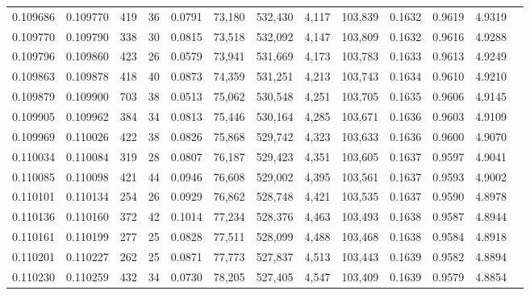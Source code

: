 \begin{tabular}{rrrrrrrrrrrrr}
0.109686 & 0.109770 &   419 &  36 &                                     0.0791 &  73,180 & 532,430 &   4,117 & 103,839 & 0.1632 & 0.9619 & 4.9319 \\
0.109770 & 0.109790 &   338 &  30 &                                     0.0815 &  73,518 & 532,092 &   4,147 & 103,809 & 0.1632 & 0.9616 & 4.9288 \\
0.109796 & 0.109860 &   423 &  26 &                                     0.0579 &  73,941 & 531,669 &   4,173 & 103,783 & 0.1633 & 0.9613 & 4.9249 \\
0.109863 & 0.109878 &   418 &  40 &                                     0.0873 &  74,359 & 531,251 &   4,213 & 103,743 & 0.1634 & 0.9610 & 4.9210 \\
0.109879 & 0.109900 &   703 &  38 &                                     0.0513 &  75,062 & 530,548 &   4,251 & 103,705 & 0.1635 & 0.9606 & 4.9145 \\
0.109905 & 0.109962 &   384 &  34 &                                     0.0813 &  75,446 & 530,164 &   4,285 & 103,671 & 0.1636 & 0.9603 & 4.9109 \\
0.109969 & 0.110026 &   422 &  38 &                                     0.0826 &  75,868 & 529,742 &   4,323 & 103,633 & 0.1636 & 0.9600 & 4.9070 \\
0.110034 & 0.110084 &   319 &  28 &                                     0.0807 &  76,187 & 529,423 &   4,351 & 103,605 & 0.1637 & 0.9597 & 4.9041 \\
0.110085 & 0.110098 &   421 &  44 &                                     0.0946 &  76,608 & 529,002 &   4,395 & 103,561 & 0.1637 & 0.9593 & 4.9002 \\
0.110101 & 0.110134 &   254 &  26 &                                     0.0929 &  76,862 & 528,748 &   4,421 & 103,535 & 0.1637 & 0.9590 & 4.8978 \\
0.110136 & 0.110160 &   372 &  42 &                                     0.1014 &  77,234 & 528,376 &   4,463 & 103,493 & 0.1638 & 0.9587 & 4.8944 \\
0.110161 & 0.110199 &   277 &  25 &                                     0.0828 &  77,511 & 528,099 &   4,488 & 103,468 & 0.1638 & 0.9584 & 4.8918 \\
0.110201 & 0.110227 &   262 &  25 &                                     0.0871 &  77,773 & 527,837 &   4,513 & 103,443 & 0.1639 & 0.9582 & 4.8894 \\
0.110230 & 0.110259 &   432 &  34 &                                     0.0730 &  78,205 & 527,405 &   4,547 & 103,409 & 0.1639 & 0.9579 & 4.8854 \\

\end{tabular}
